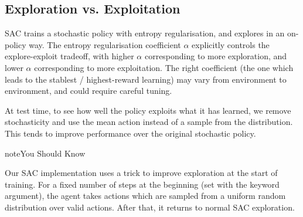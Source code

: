 \documentclass[letterpaper,10pt,english]{sphinxmanual}
\begin{document}
\subsection{Exploration vs. Exploitation}
\label{\detokenize{algorithms/sac:exploration-vs-exploitation}}
SAC trains a stochastic policy with entropy regularisation, and explores in an on-policy way. The entropy regularisation coefficient \(\alpha\) explicitly controls the explore-exploit tradeoff, with higher \(\alpha\) corresponding to more exploration, and lower \(\alpha\) corresponding to more exploitation. The right coefficient (the one which leads to the stablest / highest-reward learning) may vary from environment to environment, and could require careful tuning.

At test time, to see how well the policy exploits what it has learned, we remove stochasticity and use the mean action instead of a sample from the distribution. This tends to improve performance over the original stochastic policy.

\begin{sphinxadmonition}{note}{You Should Know}

Our SAC implementation uses a trick to improve exploration at the start of training. For a fixed number of steps at the beginning (set with the  keyword argument), the agent takes actions which are sampled from a uniform random distribution over valid actions. After that, it returns to normal SAC exploration.
\end{sphinxadmonition}
\end{document}
